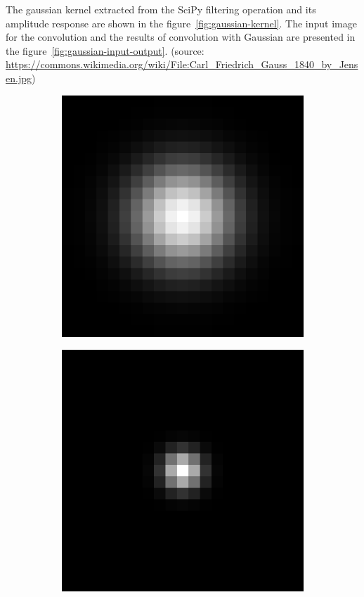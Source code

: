 \documentclass[]{article}
\begin{document}
The gaussian kernel extracted from the SciPy filtering operation and its
amplitude response are shown in the figure~\ref{fig:gaussian-kernel}. The input
image for the convolution and the results of convolution with Gaussian
are presented in the figure~\ref{fig:gaussian-input-output}. (source:
\url{https://commons.wikimedia.org/wiki/File:Carl_Friedrich_Gauss_1840_by_Jensen.jpg})
\begin{figure}
  \centering
    \begin{subfigure}[t]{0.49\textwidth}
      \centering
      \includegraphics[width=0.99\linewidth]{kernel.png}
    \end{subfigure}
    \begin{subfigure}[t]{0.49\textwidth}
      \centering
      \includegraphics[width=0.99\linewidth]{freq.png}

\end{subfigure}
\end{figure}
\end{document}
